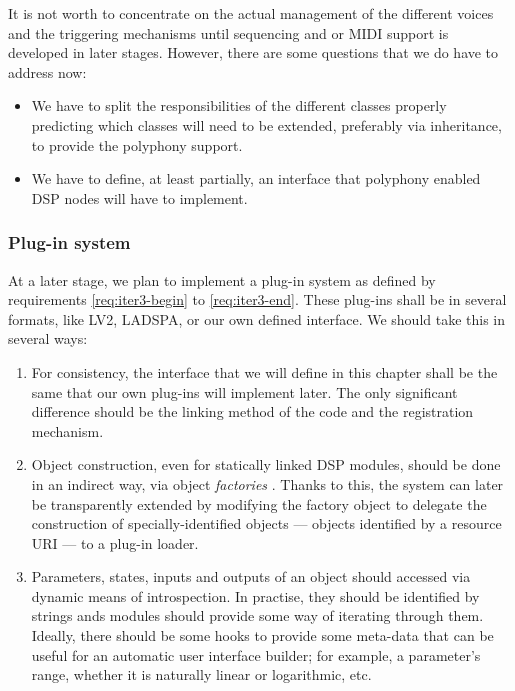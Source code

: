 It is not worth to concentrate on the actual management of the
different voices and the triggering mechanisms until sequencing and or
MIDI support is developed in later stages. However, there are some
questions that we do have to address now:

\begin{itemize}
\item We have to split the responsibilities of the different classes
properly predicting which classes will need to be extended, preferably
via inheritance, to provide the polyphony support.

\item We have to define, at least partially, an interface that
  polyphony enabled DSP nodes will have to implement.
\end{itemize}

\subsubsection{Plug-in system}

At a later stage, we plan to implement a plug-in system as defined by
requirements \ref{req:iter3-begin} to \ref{req:iter3-end}. These
plug-ins shall be in several formats, like LV2, LADSPA, or our own
defined interface. We should take this in several ways:

\begin{enumerate}
\item For consistency, the interface that we will define in this
  chapter shall be the same that our own plug-ins will implement
  later. The only significant difference should be the linking method
  of the code and the registration mechanism.

\item Object construction, even for statically linked DSP modules,
  should be done in an indirect way, via object \emph{factories}
  \cite{gamma95design}. Thanks to this, the system can later be
  transparently extended by modifying the factory object to delegate
  the construction of specially-identified objects --- objects
  identified by a resource URI \cite{mealling02rfc3305} --- to a plug-in
  loader.

\item Parameters, states, inputs and outputs of an object should
  accessed via dynamic means of introspection. In practise, they
  should be identified by strings ands modules should provide some way
  of iterating through them. Ideally, there should be some hooks to
  provide some meta-data that can be useful for an automatic user
  interface builder; for example, a parameter's range, whether it is
  naturally linear or logarithmic, etc.
\end{enumerate}

